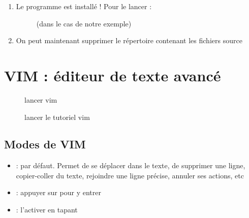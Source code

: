 \documentclass[letterpaper,10pt,french]{sphinxmanual}
\begin{document}
\begin{enumerate}
\begin{description}
\end{description}

\item {} \begin{description}
\item[{Le programme est installé ! Pour le lancer :}] \leavevmode
{} (dans le cas de notre exemple)

\end{description}

\item {} 
On peut maintenant supprimer le répertoire contenant les fichiers source

\end{enumerate}


\chapter{VIM : éditeur de texte avancé}
\label{\detokenize{20-vim:vim-editeur-de-texte-avance}}\label{\detokenize{20-vim::doc}}\begin{description}
\item[{}] \leavevmode
lancer vim

\item[{}] \leavevmode
lancer le tutoriel vim

\end{description}


\section{Modes de VIM}
\label{\detokenize{20-vim:modes-de-vim}}\begin{itemize}
\item {} 
 : par défaut. Permet de se déplacer dans le texte, de supprimer une ligne, copier-coller du texte, rejoindre une ligne précise, annuler ses actions, etc

\item {} 
 : appuyer sur  pour y entrer

\item {} 
 : l’activer en tapant \sphinxcode{\sphinxupquote{:}}

\end{itemize}
\end{document}
